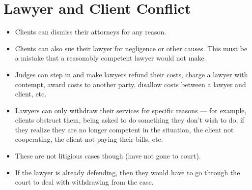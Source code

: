 \documentclass{article}
\begin{document}
\section{Lawyer and Client Conflict}
\begin{itemize}
    \item Clients can dismiss their attorneys for any reason.
    \item Clients can also sue their lawyer for negligence or other causes.  This must be a mistake that a reasonably competent lawyer would not make.
    \item Judges can step in and make lawyers refund their costs, charge a lawyer with contempt, award costs to another party, disallow costs between a lawyer and client, etc.
    \item Lawyers can only withdraw their services for specific reasons --- for example, clients obstruct them, being asked to do something they don't wish to do, if they realize they are no longer competent in the situation, the client not cooperating, the client not paying their bills, etc.
    \item These are not litigious cases though (have not gone to court).
    \item If the lawyer is already defending, then they would have to go through the court to deal with withdrawing from the case.
\end{itemize}
\end{document}
